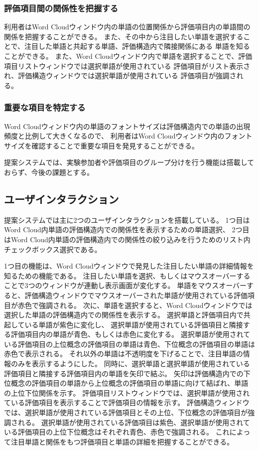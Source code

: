 \documentclass[syuuron]{kuee}
\begin{document}
			\subsubsection{評価項目間の関係性を把握する}
				利用者はWord Cloudウィンドウ内の単語の位置関係から評価項目内の単語間の関係を把握することができる。
				また、その中から注目したい単語を選択することで、注目した単語と共起する単語、評価構造内で隣接関係にある
				単語を知ることができる。
				また、Word Cloudウィンドウ内で単語を選択することで、評価項目リストウィンドウでは選択単語が使用されている
				評価項目がリスト表示され、評価構造ウィンドウでは選択単語が使用されている
				評価項目が強調される。
			\subsubsection{重要な項目を特定する}
				Word Cloudウィンドウ内の単語のフォントサイズは評価構造内での単語の出現頻度と比例して大きくなるので、
				利用者はWord Cloudウィンドウ内のフォントサイズを確認することで重要な項目を発見することができる。
			
			提案システムでは、実験参加者や評価項目のグループ分けを行う機能は搭載しておらず、今後の課題とする。			
			
		\subsection{ユーザインタラクション}
			提案システムでは主に2つのユーザインタラクションを搭載している。
			1つ目はWord Cloud内単語の評価構造内での関係性を表示するための単語選択、
			2つ目はWord Cloud内単語の評価構造内での関係性の絞り込みを行うためのリスト内チェックボックス選択である。
			
			1つ目の機能は、Word Cloudウィンドウで発見した注目したい単語の詳細情報を知るための機能である。
			注目したい単語を選択、もしくはマウスオーバーすることで3つのウィンドウが連動し表示画面が変化する。
			単語をマウスオーバーすると、評価構造ウィンドウでマウスオーバーされた単語が使用されている評価項目が赤色で強調される。
			次に、単語を選択すると、Word Cloudウィンドウでは選択した単語の評価構造内での関係性を表示する。
			選択単語と評価項目内で共起している単語が紫色に変化し、
			選択単語が使用されている評価項目と隣接する評価項目内の単語が青色、もしくは赤色に変化する。
			選択単語が使用されている評価項目の上位概念の評価項目の単語は青色、下位概念の評価項目の単語は赤色で表示される。
			それ以外の単語は不透明度を下げることで、注目単語の情報のみを表示するようにした。
			同時に、選択単語と選択単語が使用されている評価項目と隣接する評価項目内の単語を矢印で結ぶ。
			矢印は評価構造内での下位概念の評価項目の単語から上位概念の評価項目の単語に向けて結ばれ、単語の上位下位関係を示す。
			評価項目リストウィンドウでは、選択単語が使用されている評価項目を表示することで評価項目の情報を示す。
			評価構造ウィンドウでは、選択単語が使用されている評価項目とその上位、下位概念の評価項目が強調される。
			選択単語が使用されている評価項目は紫色、選択単語が使用されている評価項目の上位下位概念はそれぞれ青色、赤色で強調される。
			これによって注目単語と関係をもつ評価項目と単語の詳細を把握することができる。
			
\end{document}
